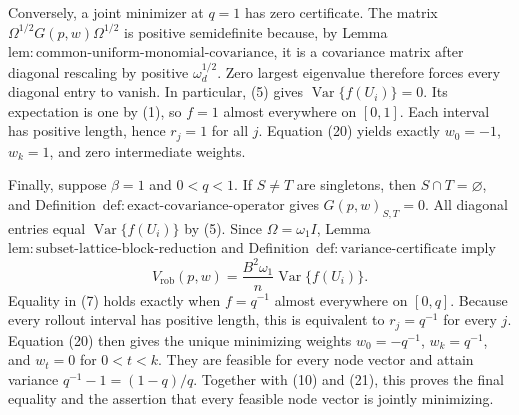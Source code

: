 Conversely, a joint minimizer at \(q=1\) has zero certificate.  The matrix \(\Omega^{1/2}G(p,w)\Omega^{1/2}\) is positive semidefinite because, by Lemma~\(\mathrm{lem{:}common\text{-}uniform\text{-}monomial\text{-}covariance}\), it is a covariance matrix after diagonal rescaling by positive \(\omega_d^{1/2}\).  Zero largest eigenvalue therefore forces every diagonal entry to vanish.  In particular, (5) gives \(\operatorname{Var}\{f(U_i)\}=0\).  Its expectation is one by (1), so \(f=1\) almost everywhere on \([0,1]\).  Each interval has positive length, hence \(r_j=1\) for all \(j\).  Equation (20) yields exactly \(w_0=-1\), \(w_k=1\), and zero intermediate weights.

Finally, suppose \(\beta=1\) and \(0<q<1\).  If \(S\ne T\) are singletons, then \(S\cap T=\varnothing\), and Definition~\(\mathrm{def{:}exact\text{-}covariance\text{-}operator}\) gives \(G(p,w)_{S,T}=0\).  All diagonal entries equal \(\operatorname{Var}\{f(U_i)\}\) by (5).  Since \(\Omega=\omega_1I\), Lemma~\(\mathrm{lem{:}subset\text{-}lattice\text{-}block\text{-}reduction}\) and Definition~\(\mathrm{def{:}variance\text{-}certificate}\) imply
\[
V_{\mathrm{rob}}(p,w)
=\frac{B^2\omega_1}{n}\operatorname{Var}\{f(U_i)\}.
\tag{21}
\]
Equality in (7) holds exactly when \(f=q^{-1}\) almost everywhere on \([0,q]\).  Because every rollout interval has positive length, this is equivalent to \(r_j=q^{-1}\) for every \(j\).  Equation (20) then gives the unique minimizing weights \(w_0=-q^{-1}\), \(w_k=q^{-1}\), and \(w_t=0\) for \(0<t<k\).  They are feasible for every node vector and attain variance \(q^{-1}-1=(1-q)/q\).  Together with (10) and (21), this proves the final equality and the assertion that every feasible node vector is jointly minimizing.